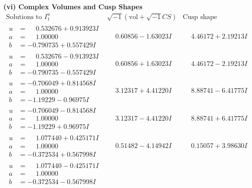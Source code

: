 \documentclass[1p]{elsarticle_modified}
\theoremstyle{definition}
\newcommand{\I}{\sqrt{-1}}
\begin{document}
\newpage\flushleft \textbf{(vi) Complex Volumes and Cusp Shapes}
$$\begin{array}{c|c|c}  
\text{Solutions to }I^u_{1}& \I (\text{vol} + \sqrt{-1}CS) & \text{Cusp shape}\\
 \hline 
\begin{aligned}
u &= \phantom{-}0.532676 + 0.913923 I \\
a &= \phantom{-}1.00000\phantom{ +0.000000I} \\
b &= -0.790735 + 0.557429 I\end{aligned}
 & \phantom{-}0.60856 - 1.63023 I & \phantom{-}4.46172 + 2.19213 I \\ \hline\begin{aligned}
u &= \phantom{-}0.532676 - 0.913923 I \\
a &= \phantom{-}1.00000\phantom{ +0.000000I} \\
b &= -0.790735 - 0.557429 I\end{aligned}
 & \phantom{-}0.60856 + 1.63023 I & \phantom{-}4.46172 - 2.19213 I \\ \hline\begin{aligned}
u &= -0.706049 + 0.814568 I \\
a &= \phantom{-}1.00000\phantom{ +0.000000I} \\
b &= -1.19229 - 0.96975 I\end{aligned}
 & \phantom{-}3.12317 + 4.41220 I & \phantom{-}8.88741 - 6.41775 I \\ \hline\begin{aligned}
u &= -0.706049 - 0.814568 I \\
a &= \phantom{-}1.00000\phantom{ +0.000000I} \\
b &= -1.19229 + 0.96975 I\end{aligned}
 & \phantom{-}3.12317 - 4.41220 I & \phantom{-}8.88741 + 6.41775 I \\ \hline\begin{aligned}
u &= \phantom{-}1.077440 + 0.425171 I \\
a &= \phantom{-}1.00000\phantom{ +0.000000I} \\
b &= -0.372534 + 0.567998 I\end{aligned}
 & \phantom{-}0.51482 - 4.14942 I & \phantom{-}0.15057 + 3.98630 I \\ \hline\begin{aligned}
u &= \phantom{-}1.077440 - 0.425171 I \\
a &= \phantom{-}1.00000\phantom{ +0.000000I} \\
b &= -0.372534 - 0.567998 I\end{aligned}

\end{array}$$
\end{document}
